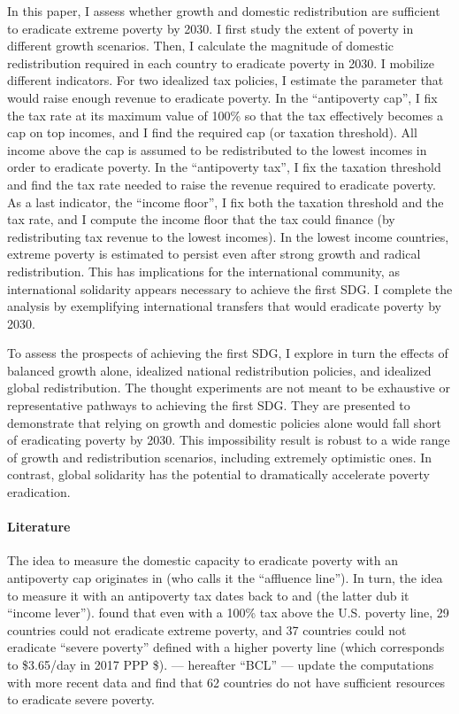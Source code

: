 \documentclass[12pt,english]{article}
\begin{document}
In this paper, I assess whether growth and domestic redistribution are sufficient to eradicate extreme poverty by 2030. I first study the extent of poverty in different growth scenarios. Then, I calculate the magnitude of domestic redistribution required in each country to eradicate poverty in 2030. I mobilize different indicators. For two idealized tax policies, I estimate the parameter that would raise enough revenue to eradicate poverty. In the ``antipoverty cap'', I fix the tax rate at its maximum value of 100\% so that the tax effectively becomes a cap on top incomes, and I find the required cap (or taxation threshold). All income above the cap is assumed to be redistributed to the lowest incomes in order to eradicate poverty. In the ``antipoverty tax'', I fix the taxation threshold and find the tax rate needed to raise the revenue required to eradicate poverty. As a last indicator, the ``income floor'', I fix both the taxation threshold and the tax rate, and I compute the income floor that the tax could finance (by redistributing tax revenue to the lowest incomes). In the lowest income countries, extreme poverty is estimated to persist even after strong growth and radical redistribution. %
This has implications for the international community, as international solidarity appears necessary to achieve the first SDG. I complete the analysis by exemplifying international transfers that would eradicate poverty by 2030.

To assess the prospects of achieving the first SDG, I explore in turn the effects of balanced growth alone, idealized national redistribution policies, and idealized global redistribution. The thought experiments are not meant to be exhaustive or representative pathways to achieving the first SDG. They are presented to demonstrate that relying on growth and domestic policies alone would fall short of eradicating poverty by 2030. This impossibility result is robust to a wide range of growth and redistribution scenarios, including extremely optimistic ones. In contrast, global solidarity has the potential to dramatically accelerate poverty eradication.

\paragraph{Literature} 

The idea to measure the domestic capacity to eradicate poverty with an antipoverty cap originates in \cite{medeiros_rich_2006} (who calls it the ``affluence line''). In turn, the idea to measure it with an antipoverty tax dates back to \cite{ravallion_poorer_2010} and \cite{ceriani_income_2014} (the latter dub it ``income lever''). \cite{ravallion_poorer_2010} found that even with a 100\% tax above the U.S. poverty line, 29 countries could not eradicate extreme poverty, and 37 countries could not eradicate ``severe poverty'' defined with a higher poverty line (which corresponds to \$3.65/day in 2017 PPP \$). %
\cite{bolch_arithmetics_2022} --- hereafter ``BCL'' --- update the computations with more recent data and find that 62 countries do not have sufficient resources to eradicate severe poverty. %
\end{document}
